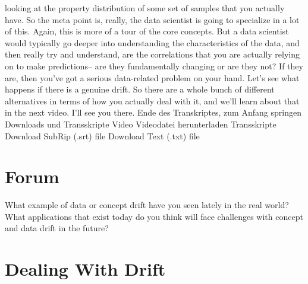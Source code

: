 {{{{{{{{    looking at the property distribution of some set of samples
    that you actually have.
    So the meta point is, really, the data scientist
    is going to specialize in a lot of this.
    Again, this is more of a tour of the core concepts.
    But a data scientist would typically go deeper
    into understanding the characteristics of the data,
    and then really try and understand, are the correlations
    that you are actually relying on to make predictions--
    are they fundamentally changing or are they not?
    If they are, then you've got a serious data-related problem on your hand.
    Let's see what happens if there is a genuine drift.
    So there are a whole bunch of different alternatives
    in terms of how you actually deal with it,
    and we'll learn about that in the next video.
    I'll see you there.
    Ende des Transkriptes, zum Anfang springen
    Downloads und Transskripte
    Video
    Videodatei herunterladen
    Transskripte
    Download SubRip (.srt) file
    Download Text (.txt) file

 \section{Forum}
 
 What example of data or concept drift have you seen lately in the real world? What applications that exist today do you think will face challenges with concept and data drift in the future?
 
 \section{Dealing With Drift}
 
}}}}}}}}

